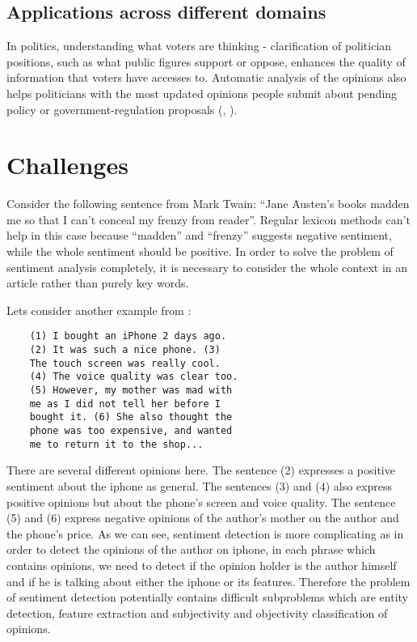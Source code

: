 \documentclass{article}
\begin{document}
\begin{multicols}{2}
    \subsection{Applications across different domains}
      In politics, understanding what voters are thinking - clarification
of politician positions, such as what public figures support or oppose, 
enhances the quality of information that voters have accesses to. Automatic 
analysis of the opinions also helps politicians with the most updated opinions 
people submit about pending policy or government-regulation proposals 
(\citet{Cynthia2006}, \citet{Kwon2006}).

\section{Challenges}
    Consider the following sentence from Mark Twain: ``Jane Austen's books
madden me so that I can't conceal my frenzy from reader''. Regular lexicon
methods can't help in this case because ``madden'' and ``frenzy'' suggests
negative sentiment, while the whole sentiment should be positive. In order to
solve the problem of sentiment analysis completely, it is necessary to consider
the whole context in an article rather than purely key words.
    
    Lets consider another example from \citet{Liu2010}:
    \begin{verbatim}
    (1) I bought an iPhone 2 days ago. 
    (2) It was such a nice phone. (3) 
    The touch screen was really cool. 
    (4) The voice quality was clear too. 
    (5) However, my mother was mad with 
    me as I did not tell her before I 
    bought it. (6) She also thought the 
    phone was too expensive, and wanted 
    me to return it to the shop...
    \end{verbatim}

    There are several different opinions here. The sentence (2) expresses
a positive sentiment about the iphone as general. The sentences (3) and
(4) also express positive opinions but about the phone's screen and voice
quality. The sentence (5) and (6) express negative opinions of the author's
mother on the author and the phone's price. As we can see, sentiment detection
is more complicating as in order to detect the opinions of the author on iphone,
in each phrase which contains opinions, we need to detect if the opinion holder
is the author himself and if he is talking about either the iphone or its
features. Therefore the problem of sentiment detection potentially contains
difficult subproblems which are entity detection, feature extraction
and subjectivity and objectivity classification of opinions.
  

\end{multicols}
\end{document}
